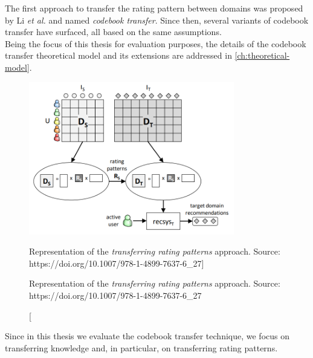 \begin{itemize}
\begin{itemize}
The first approach to transfer the rating pattern between domains was proposed by Li \textit{et al.} \cite{10.5555/1661445.1661773} and named \textit{codebook transfer}. Since then, several variants of codebook transfer have surfaced, all based on the same assumptions.\\
Being the focus of this thesis for evaluation purposes, the details of the codebook transfer theoretical model and its extensions are addressed in \autoref{ch:theoretical-model}.
\begin{figure}[hbt]
  \centering
  \includegraphics[width=0.8\textwidth]{pictures/transferring-rating-patterns}
  \caption
  [Representation of the \textit{transferring rating patterns} approach. Source: https://doi.org/10.1007/978-1-4899-7637-6\_27]
  {\protect\raggedright Representation of the \textit{transferring rating patterns} approach. Source: https://doi.org/10.1007/978-1-4899-7637-6\_27}
\end{figure}
\end{itemize}
\end{itemize}
Since in this thesis we evaluate the codebook transfer technique, we focus on transferring knowledge and, in particular, on transferring rating patterns.
